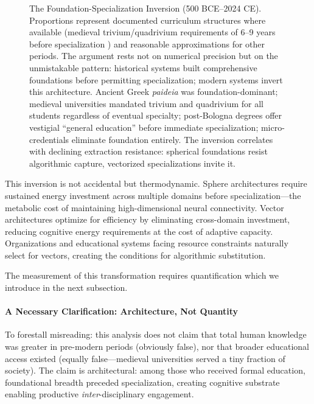 \begin{figure}[htbp]
\caption{The Foundation-Specialization Inversion (500 BCE--2024 CE). Proportions represent documented curriculum structures where available (medieval trivium/quadrivium requirements of 6--9 years before specialization \citep{history_hit_medieval}) and reasonable approximations for other periods. The argument rests not on numerical precision but on the unmistakable pattern: historical systems built comprehensive foundations before permitting specialization; modern systems invert this architecture. Ancient Greek \textit{paideia} was foundation-dominant; medieval universities mandated trivium and quadrivium for all students regardless of eventual specialty; post-Bologna degrees offer vestigial ``general education'' before immediate specialization; micro-credentials eliminate foundation entirely. The inversion correlates with declining extraction resistance: spherical foundations resist algorithmic capture, vectorized specializations invite it.}
\label{fig:foundation-inversion}
\end{figure}

This inversion is not accidental but thermodynamic. Sphere architectures require sustained energy investment across multiple domains before specialization—the metabolic cost of maintaining high-dimensional neural connectivity. Vector architectures optimize for efficiency by eliminating cross-domain investment, reducing cognitive energy requirements at the cost of adaptive capacity. Organizations and educational systems facing resource constraints naturally select for vectors, creating the conditions for algorithmic substitution.

The measurement of this transformation requires quantification which we introduce in the next subsection.

\paragraph{A Necessary Clarification: Architecture, Not Quantity}

To forestall misreading: this analysis does not claim that total human knowledge was greater in pre-modern periods (obviously false), nor that broader educational access existed (equally false—medieval universities served a tiny fraction of society). The claim is architectural: among those who received formal education, foundational breadth preceded specialization, creating cognitive substrate enabling productive \textit{inter}-disciplinary engagement.

